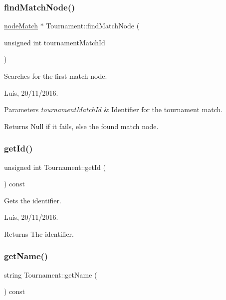 \subsubsection{\texorpdfstring{find\+Match\+Node()}{findMatchNode()}}
{\footnotesize\ttfamily \hyperlink{_tournament_8hpp_a59a90f79e961bd9bc490adbf767f7cc4}{node\+Match} $\ast$ Tournament\+::find\+Match\+Node (\begin{DoxyParamCaption}\item[{unsigned int}]{tournament\+Match\+Id }\end{DoxyParamCaption})}



Searches for the first match node. 

Luís, 20/11/2016. 


\begin{DoxyParams}{Parameters}
{\em tournament\+Match\+Id} & Identifier for the tournament match. \\
\hline
\end{DoxyParams}


\begin{DoxyReturn}{Returns}
Null if it fails, else the found match node. 
\end{DoxyReturn}
\hypertarget{class_tournament_ad5e59e6551498b634e7bd745a7967fc9}{}\label{class_tournament_ad5e59e6551498b634e7bd745a7967fc9} 
\subsubsection{\texorpdfstring{get\+Id()}{getId()}}
{\footnotesize\ttfamily unsigned int Tournament\+::get\+Id (\begin{DoxyParamCaption}{ }\end{DoxyParamCaption}) const}



Gets the identifier. 

Luís, 20/11/2016. 

\begin{DoxyReturn}{Returns}
The identifier. 
\end{DoxyReturn}
\hypertarget{class_tournament_a94cfb5371bd09ab75a50a13ef924ae58}{}\label{class_tournament_a94cfb5371bd09ab75a50a13ef924ae58} 
\subsubsection{\texorpdfstring{get\+Name()}{getName()}}
{\footnotesize\ttfamily string Tournament\+::get\+Name (\begin{DoxyParamCaption}{ }\end{DoxyParamCaption}) const}




